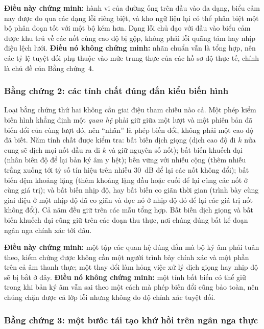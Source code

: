 \documentclass[12pt,a4paper]{article}
\begin{document}
\textbf{Điều này chứng minh:} hành vi của đường ống trên đầu vào đa dạng, biểu cảm
nay được đo qua các dạng lỗi riêng biệt, và kho ngữ liệu lại có thể phân biệt một bộ
phân đoạn tốt với một bộ kém hơn. Dạng lỗi chủ đạo với đầu vào biểu cảm được khu trú
về các nốt cùng cao độ bị gộp, không phải lỗi quãng tám hay nhịp điệu lệch lưới.
\textbf{Điều nó không chứng minh:} nhãn chuẩn vẫn là tổng hợp, nên các tỷ lệ tuyệt
đối phụ thuộc vào mức trung thực của các hồ sơ độ thực tế, chính là chủ đề của Bằng
chứng~4.

\subsubsection{Bằng chứng 2: các tính chất đúng đắn kiểu biến hình}
\label{sec:meta}

Loại bằng chứng thứ hai không cần giai điệu tham chiếu nào cả. Một phép kiểm biến
hình khẳng định một \emph{quan hệ} phải giữ giữa một lượt và một phiên bản đã biến
đổi của cùng lượt đó, nên ``nhãn'' là phép biến đổi, không phải một cao độ đã biết.
Năm tính chất được kiểm tra: bất biến dịch giọng (dịch cao độ đi $k$ nửa cung sẽ
dịch mọi nốt đầu ra đi $k$ và giữ nguyên số nốt); bất biến khuếch đại (nhân biên độ
để lại bản ký âm y hệt); bền vững với nhiễu cộng (thêm nhiễu trắng xuống tới tỷ số
tín hiệu trên nhiễu $30$~dB để lại các nốt không đổi); bất biến đệm khoảng lặng
(thêm khoảng lặng đầu hoặc cuối để lại cùng các nốt ở cùng giá trị); và bất biến
nhịp độ, hay bất biến co giãn thời gian (trình bày cùng giai điệu ở một nhịp độ đã
co giãn và đọc nó ở nhịp độ đó để lại các giá trị nốt không đổi). Cả năm đều giữ
trên các mẫu tổng hợp. Bất biến dịch giọng và bất biến khuếch đại cũng giữ trên các
đoạn thu thực, nơi chúng đúng bất kể đoạn ngân nga chính xác tới đâu.

\textbf{Điều này chứng minh:} một tập các quan hệ đúng đắn mà bộ ký âm phải tuân
theo, kiểm chứng được không cần một người trình bày chính xác và một phần trên cả âm
thanh thực; một thay đổi làm hỏng việc xử lý dịch giọng hay nhịp độ sẽ bị bắt ở đây.
\textbf{Điều nó không chứng minh:} một tính bất biến có thể giữ trong khi bản ký âm
vẫn sai theo một cách mà phép biến đổi cũng bảo toàn, nên chúng chặn được cả lớp lỗi
nhưng không đo độ chính xác tuyệt đối.

\subsubsection{Bằng chứng 3: một bước tái tạo khứ hồi trên ngân nga thực}
\label{sec:roundtrip}
\end{document}
